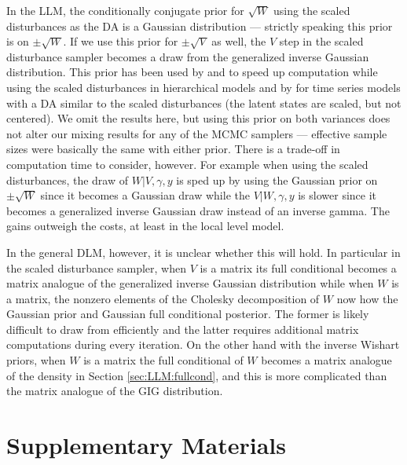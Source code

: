 \documentclass[12pt]{article}
\begin{document}
In the LLM, the conditionally conjugate prior for $\sqrt{W}$ using the scaled disturbances as the DA is a Gaussian distribution --- strictly speaking this prior is on $\pm \sqrt{W}$. If we use this prior for $\pm\sqrt{V}$ as well, the $V$ step in the scaled disturbance sampler becomes a draw from the generalized inverse Gaussian distribution. This prior has been used by \citet{fruhwirth2011bayesian} and \citet{fruhwirth2008bayesian} to speed up computation while using the scaled disturbances in hierarchical models and by \citet{fruhwirth2010stochastic} for time series models with a DA similar to the scaled disturbances (the latent states are scaled, but not centered). We omit the results here, but using this prior on both variances does not alter our mixing results for any of the MCMC samplers --- effective sample sizes were basically the same with either prior. There is a trade-off in computation time to consider, however. For example when using the scaled disturbances, the draw of $W|V,\gamma,y$ is sped up by using the Gaussian prior on $\pm\sqrt{W}$ since it becomes a Gaussian draw while the $V|W,\gamma,y$ is slower since it becomes a generalized inverse Gaussian draw instead of an inverse gamma. The gains outweigh the costs, at least in the local level model.

In the general DLM, however, it is unclear whether this will hold. In particular in the scaled disturbance sampler, when $V$ is a matrix its full conditional becomes a matrix analogue of the generalized inverse Gaussian distribution while when $W$ is a matrix, the nonzero elements of the Cholesky decomposition of $W$ now how the Gaussian prior and Gaussian full conditional posterior. The former is likely difficult to draw from efficiently and the latter requires additional matrix computations during every iteration. On the other hand with the inverse Wishart priors, when $W$ is a matrix the full conditional of $W$ becomes a matrix analogue of the density in Section \ref{sec:LLM:fullcond}, and this is more complicated than the matrix analogue of the GIG distribution.

\newpage
\section{Supplementary Materials}\label{sec:Supp}
\end{document}
